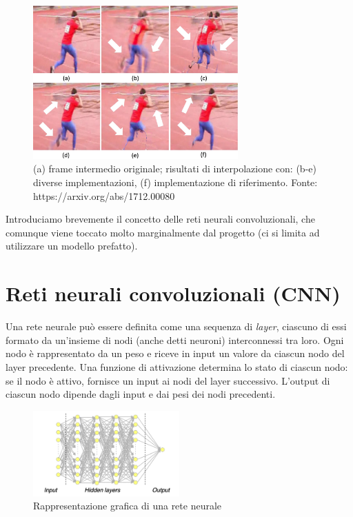 \newpage

\begin{figure}[t!]
    \includegraphics[width=0.7\textwidth]{img/confronto_interpolazione_frame.jpg}
    \centering
    \caption{(a) frame intermedio originale; risultati di interpolazione con: (b-e) diverse implementazioni, (f) implementazione
    di riferimento. Fonte: https://arxiv.org/abs/1712.00080}
    \label{fig:confronto_interpolazione_frame}
\end{figure}

Introduciamo brevemente il concetto delle reti neurali convoluzionali, che comunque viene toccato molto marginalmente dal
progetto (ci si limita ad utilizzare un modello prefatto).

\section*{Reti neurali convoluzionali (CNN)}

Una rete neurale può essere definita come una sequenza di \textit{layer}, ciascuno di essi formato da un'insieme di nodi (anche
detti neuroni) interconnessi tra loro. Ogni nodo è rappresentato da un peso e riceve in input un valore da ciascun nodo del layer 
precedente. Una funzione di attivazione determina lo stato di ciascun nodo: se il nodo è attivo, fornisce un input ai nodi del
layer successivo. L'output di ciascun nodo dipende dagli input e dai pesi dei nodi precedenti.

\begin{figure}[h!]
    \includegraphics[width=0.5\textwidth]{img/rete_neurale.jpg}
    \centering
    \caption{Rappresentazione grafica di una rete neurale}
    \label{fig:rete_neurale}
\end{figure}

